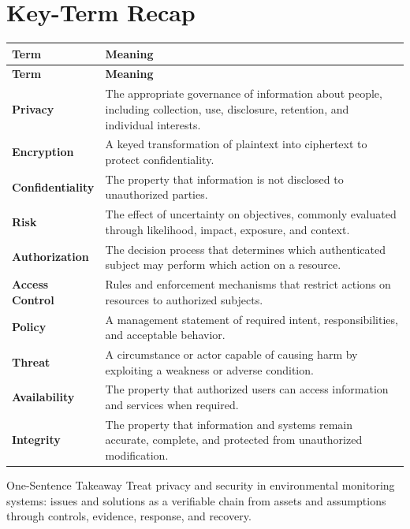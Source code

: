 \documentclass[11pt,letterpaper]{article}
\begin{document}
\section*{Key-Term Recap}
\begin{longtable}{>{\RaggedRight\arraybackslash}p{}>{\RaggedRight\arraybackslash}p{}}
\toprule\rowcolor{Navy}\color{white}\textbf{Term} & \color{white}\textbf{Meaning}\\\midrule
\endfirsthead
\toprule\rowcolor{Navy}\color{white}\textbf{Term} & \color{white}\textbf{Meaning}\\\midrule
\endhead
\textbf{Privacy} & The appropriate governance of information about people, including collection, use, disclosure, retention, and individual interests. \\\midrule
\textbf{Encryption} & A keyed transformation of plaintext into ciphertext to protect confidentiality. \\\midrule
\textbf{Confidentiality} & The property that information is not disclosed to unauthorized parties. \\\midrule
\textbf{Risk} & The effect of uncertainty on objectives, commonly evaluated through likelihood, impact, exposure, and context. \\\midrule
\textbf{Authorization} & The decision process that determines which authenticated subject may perform which action on a resource. \\\midrule
\textbf{Access Control} & Rules and enforcement mechanisms that restrict actions on resources to authorized subjects. \\\midrule
\textbf{Policy} & A management statement of required intent, responsibilities, and acceptable behavior. \\\midrule
\textbf{Threat} & A circumstance or actor capable of causing harm by exploiting a weakness or adverse condition. \\\midrule
\textbf{Availability} & The property that authorized users can access information and services when required. \\\midrule
\textbf{Integrity} & The property that information and systems remain accurate, complete, and protected from unauthorized modification. \\\midrule
\bottomrule
\end{longtable}
\begin{CornellExamBox}{One-Sentence Takeaway}
Treat privacy and security in environmental monitoring systems: issues and solutions as a verifiable chain from assets and assumptions through controls, evidence, response, and recovery.
\end{CornellExamBox}
\end{document}
